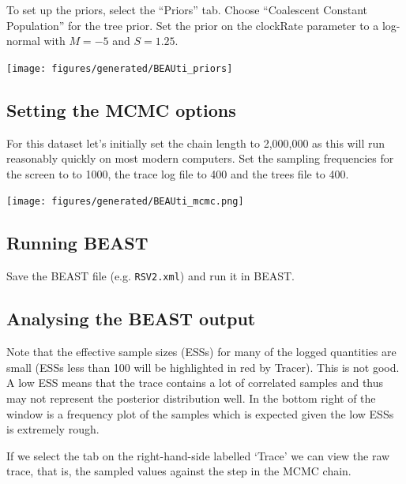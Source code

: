 \documentclass[12pt]{article}
\begin{document}
To set up the priors, select the ``Priors'' tab.
Choose ``Coalescent Constant Population'' for the tree prior. Set the prior on the clockRate parameter to a log-normal with $M=-5$ and $S=1.25$. 

\medskip{}

\begin{center}
\texttt{[image: figures/generated/BEAUti\_priors]}
\end{center}

\medskip{}

\subsection{Setting the MCMC options}

For this dataset let's initially set the chain length to 2,000,000 as this will run 
reasonably quickly on most modern computers. Set the sampling frequencies for the screen to
to 1000, the trace log file to 400 and the trees file to 400.

\begin{center}
\texttt{[image: figures/generated/BEAUti\_mcmc.png]}
\end{center}


\subsection*{Running BEAST}

Save the BEAST file (e.g. \texttt{RSV2.xml}) and run it in BEAST.

\subsection*{Analysing the BEAST output}

Note that the effective sample sizes (ESSs) for many of the logged quantities are small (ESSs less than 100 will be highlighted in red by Tracer).
This is not good. A low ESS means that the trace contains a lot of correlated samples and thus may not represent the
posterior distribution well. In the bottom right of the window is a frequency plot of the samples which is expected given the
low ESSs is extremely rough.

If we select the tab on the right-hand-side labelled `Trace' we can view the raw trace, that is, the sampled values against the step in the MCMC chain.

\medskip{}
\end{document}
